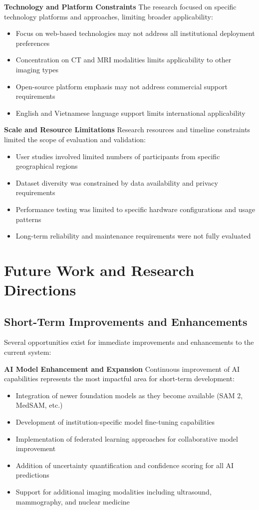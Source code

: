 \textbf{Technology and Platform Constraints}
The research focused on specific technology platforms and approaches, limiting broader applicability:

\begin{itemize}
    \item Focus on web-based technologies may not address all institutional deployment preferences
    \item Concentration on CT and MRI modalities limits applicability to other imaging types
    \item Open-source platform emphasis may not address commercial support requirements
    \item English and Vietnamese language support limits international applicability
\end{itemize}

\textbf{Scale and Resource Limitations}
Research resources and timeline constraints limited the scope of evaluation and validation:

\begin{itemize}
    \item User studies involved limited numbers of participants from specific geographical regions
    \item Dataset diversity was constrained by data availability and privacy requirements
    \item Performance testing was limited to specific hardware configurations and usage patterns
    \item Long-term reliability and maintenance requirements were not fully evaluated
\end{itemize}

\section{Future Work and Research Directions}

\subsection{Short-Term Improvements and Enhancements}

Several opportunities exist for immediate improvements and enhancements to the current system:

\textbf{AI Model Enhancement and Expansion}
Continuous improvement of AI capabilities represents the most impactful area for short-term development:

\begin{itemize}
    \item Integration of newer foundation models as they become available (SAM 2, MedSAM, etc.)
    \item Development of institution-specific model fine-tuning capabilities
    \item Implementation of federated learning approaches for collaborative model improvement
    \item Addition of uncertainty quantification and confidence scoring for all AI predictions
    \item Support for additional imaging modalities including ultrasound, mammography, and nuclear medicine
\end{itemize}

